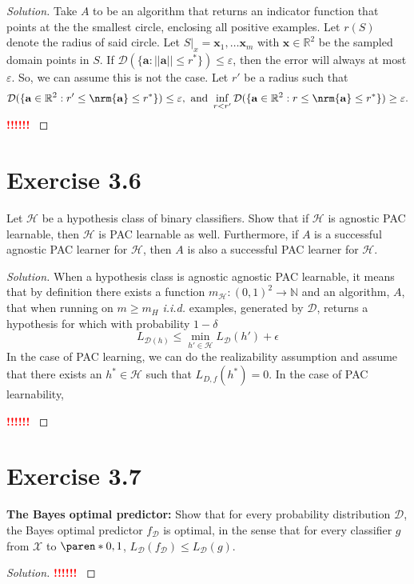 \documentclass[10pt, a4paper, twoside]{amsart}
\newcommand{\N}{\ensuremath{\mathbb{N}}}
\newcommand{\R}{\ensuremath{\mathbb{R}}}
\DeclarePairedDelimiter\paren()
\DeclarePairedDelimiter{\nrm}\lVert\rVert
\newenvironment{solution}
               {\let\oldqedsymbol=\qedsymbol
                \renewcommand{\qedsymbol}{$\blacktriangleleft$}
                \begin{proof}[Solution]}
               {\end{proof}
                \renewcommand{\qedsymbol}{\oldqedsymbol}}
\newcommand{\TODO}{\textcolor{red}{\textbf{!!!!!! }}}
\begin{document}
\begin{solution}
  Take $A$ to be an algorithm that returns an indicator function that points at the the smallest circle, enclosing all positive examples. Let $r(S)$ denote the radius of said circle.
  Let $S|_x  = \mathbf{x}_1,\ldots \mathbf{x}_m$ with $\mathbf{x} \in \R^2$ be the sampled domain points in $S$. 
  If $\mathcal{D}(\{\mathbf{a}:||\mathbf{a}||\leq r^{*}\}) \leq \varepsilon $, 
  then the error will always at most $\varepsilon$.
  So, we can assume this is not the case.
  Let $r'$ be a radius such that
  \begin{equation*}
    \mathcal{D}(\{\mathbf{a} \in \R^2 : r' \leq \nrm{\mathbf{a}} \leq r^*\}) \leq \varepsilon, \text{ and }
    \inf_{r<r'}\mathcal{D}(\{\mathbf{a} \in \R^2 : r \leq \nrm{\mathbf{a}} \leq r^*\}) \geq \varepsilon.
  \end{equation*}
  \TODO
  
\end{solution}


\section*{Exercise 3.6}
Let $\mathcal{H}$ be a hypothesis class of binary classifiers. Show that if $\mathcal{H}$ is agnostic PAC learnable, then $\mathcal{H}$ is PAC learnable as well.
Furthermore, if $A$ is a successful agnostic PAC learner for $\mathcal{H}$, then $A$ is also a successful PAC learner for $\mathcal{H}$.
\begin{solution}
  When a hypothesis class is agnostic agnostic  PAC learnable, it means that by definition there exists a function $m_{\mathcal{H}}:(0,1)^2\to \N$ and an algorithm, $A$, that when running on $m\geq m_{H}$ \textit{i.i.d.} examples, generated by $\mathcal{D}$, returns a hypothesis for which
  with probability $1-\delta$
  \begin{equation*}
    L_{\mathcal{D}(h)} \leq \min_{h' \in \mathcal{H}}L_{\mathcal{D}}(h')+\epsilon
  \end{equation*}
In the case of PAC learning, we can do the realizability assumption and assume that there exists an $h^* \in \mathcal{H}$ such that $L_{D,f}(h^*) = 0$. In the case of PAC learnability, 
  
    
  \TODO
\end{solution}


\section*{Exercise 3.7}
\textbf{The Bayes optimal predictor:} Show that for every probability distribution $\mathcal{D}$, the Bayes optimal predictor $f_{\mathcal{D}}$ is optimal, in the sense that for every classifier $g$ from $\mathcal{X}$ to $\paren*{0,1}$, $L_{\mathcal{D}}(f_{\mathcal{D}}) \leq L_{\mathcal{D}}(g)$.
\begin{solution}
  \TODO
\end{solution}
\end{document}
